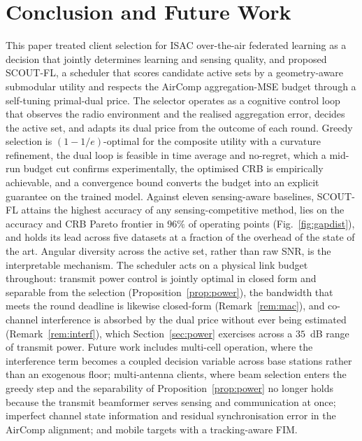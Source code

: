 \documentclass[lettersize,journal]{IEEEtran}
\newcommand{\scout}{SCOUT-FL}
\begin{document}
\section{Conclusion and Future Work}\label{sec:conclusion}
This paper treated client selection for ISAC over-the-air federated learning as a decision that jointly determines learning and sensing quality, and proposed \scout{}, a scheduler that scores candidate active sets by a geometry-aware submodular utility and respects the AirComp aggregation-MSE budget through a self-tuning primal-dual price. The selector operates as a cognitive control loop that observes the radio environment and the realised aggregation error, decides the active set, and adapts its dual price from the outcome of each round. Greedy selection is $(1-1/e)$-optimal for the composite utility with a curvature refinement, the dual loop is feasible in time average and no-regret, which a mid-run budget cut confirms experimentally, the optimised CRB is empirically achievable, and a convergence bound converts the budget into an explicit guarantee on the trained model. Against eleven sensing-aware baselines, \scout{} attains the highest accuracy of any sensing-competitive method, lies on the accuracy and CRB Pareto frontier in $96\%$ of operating points (Fig.~\ref{fig:gapdist}), and holds its lead across five datasets at a fraction of the overhead of the state of the art. Angular diversity across the active set, rather than raw SNR, is the interpretable mechanism. The scheduler acts on a physical link budget throughout: transmit power control is jointly optimal in closed form and separable from the selection (Proposition~\ref{prop:power}), the bandwidth that meets the round deadline is likewise closed-form (Remark~\ref{rem:mac}), and co-channel interference is absorbed by the dual price without ever being estimated (Remark~\ref{rem:interf}), which Section~\ref{sec:power} exercises across a $35$~dB range of transmit power. Future work includes multi-cell operation, where the interference term becomes a coupled decision variable across base stations rather than an exogenous floor; multi-antenna clients, where beam selection enters the greedy step and the separability of Proposition~\ref{prop:power} no longer holds because the transmit beamformer serves sensing and communication at once; imperfect channel state information and residual synchronisation error in the AirComp alignment; and mobile targets with a tracking-aware FIM.

\appendices
\end{document}
